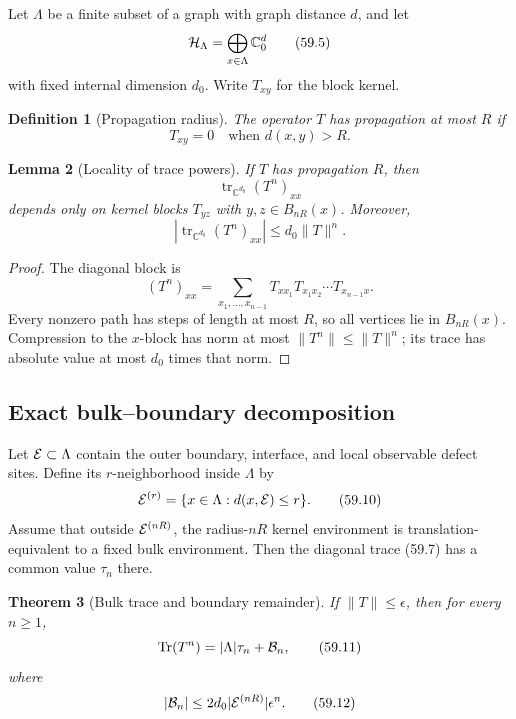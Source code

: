 \documentclass[11pt]{article}
\newtheorem{theorem}{Theorem}[section]
\newtheorem{lemma}[theorem]{Lemma}
\newtheorem{definition}[theorem]{Definition}
\begin{document}
Let \(\Lambda\) be a finite subset of a graph with graph distance
\(d\), and let
\[
                         {\cal H}_\Lambda
                    =\bigoplus_{x\in\Lambda}\mathbb C^d_0     \tag{59.5}
\]
with fixed internal dimension \(d_0\).  Write \(T_{xy}\) for the block
kernel.

\begin{definition}[Propagation radius]
\label{def:v11v59-propagation}
The operator \(T\) has propagation at most \(R\) if
\[
                              T_{xy}=0\quad\text{when }d(x,y)>R.
                                                                  \tag{59.6}
\]
\end{definition}

\begin{lemma}[Locality of trace powers]
\label{lem:v11v59-power-local}
If \(T\) has propagation \(R\), then
\[
 \operatorname{tr}_{\mathbb C^{d_0}}(T^n)_{xx}               \tag{59.7}
\]
depends only on kernel blocks \(T_{yz}\) with
\(y,z\in B_{nR}(x)\).  Moreover,
\[
       \left|\operatorname{tr}_{\mathbb C^{d_0}}(T^n)_{xx}\right|
                         \le d_0\lVert T\rVert^n.              \tag{59.8}
\]
\end{lemma}

\begin{proof}
The diagonal block is
\[
 (T^n)_{xx}
 =\sum_{x_1,\ldots,x_{n-1}}
       T_{xx_1}T_{x_1x_2}\cdots T_{x_{n-1}x}.                 \tag{59.9}
\]
Every nonzero path has steps of length at most \(R\), so all vertices
lie in \(B_{nR}(x)\).  Compression to the \(x\)-block has norm at most
\(\lVert T^n\rVert\le\lVert T\rVert^n\); its trace has absolute value
at most \(d_0\) times that norm.
\end{proof}

\subsection{Exact bulk--boundary decomposition}

Let \({\cal E}\subset\Lambda\) contain the outer boundary, interface,
and local observable defect sites.  Define its \(r\)-neighborhood
inside \(\Lambda\) by
\[
                         {\cal E}^{(r)}
       =\{x\in\Lambda:d(x,{\cal E})\le r\}.                   \tag{59.10}
\]
Assume that outside \({\cal E}^{(nR)}\), the radius-\(nR\) kernel
environment is translation-equivalent to a fixed bulk environment.
Then the diagonal trace (59.7) has a common value \(\tau_n\) there.

\begin{theorem}[Bulk trace and boundary remainder]
\label{thm:v11v59-bulk}
If \(\lVert T\rVert\le\epsilon\), then for every \(n\ge1\),
\[
                 \operatorname{Tr}(T^n)
                       =|\Lambda|\tau_n+{\cal B}_n,           \tag{59.11}
\]
where
\[
                         |{\cal B}_n|
                   \le2d_0|{\cal E}^{(nR)}|\epsilon^n.        \tag{59.12}
\]
\end{theorem}
\end{document}
